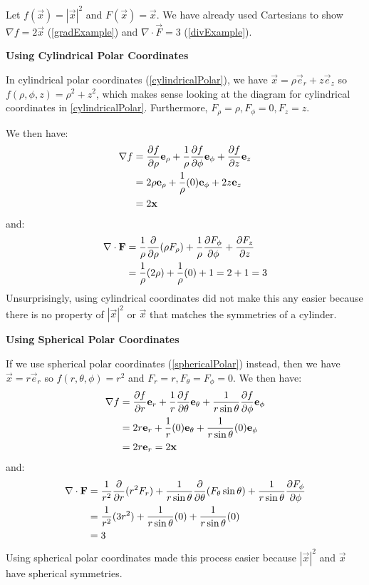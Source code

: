 \documentclass[../main.tex]{subfiles}
\begin{document}
\begin{example}
  Let $f(\vec{x}) = |\vec{x}|^2$ and $F(\vec{x}) = \vec{x}$.
  We have already used Cartesians to show $\nabla f = 2\vec{x}$ (\cref{gradExample}) and $\nabla \cdot \vec{F} = 3$ (\cref{divExample}).

  \textbf{Using Cylindrical Polar Coordinates}\par
  In cylindrical polar coordinates (\cref{cylindricalPolar}), we have $\vec{x} = \rho \vec{e}_r + z \vec{e}_z$ so $f(\rho, \phi, z) = \rho^2 + z^2$, which makes sense looking at the diagram for cylindrical coordinates in \cref{cylindricalPolar}.
  Furthermore, $F_\rho = \rho, F_\phi = 0, F_z = z$.

  We then have:
  \begin{align*}
    \nabla f &= \pderiv{f}{\rho} \vec{e}_\rho + \frac{1}{\rho}\pderiv{f}{\phi} \vec{e}_\phi + \pderiv{f}{z} \vec{e}_z \\
             &= 2\rho \vec{e}_\rho + \frac{1}{\rho}(0)\vec{e}_\phi  + 2z \vec{e}_z \\
             &= 2\vec{x}
  \end{align*}
  and:
  \begin{align*}
    \nabla \cdot \vec{F} &= \frac{1}{\rho} \pderiv{}{\rho}(\rho F_\rho) + \frac{1}{\rho} \pderiv{F_\phi}{\phi} + \pderiv{F_z}{z} \\
                         &= \frac{1}{\rho}(2\rho) + \frac{1}{\rho}(0) + 1 = 2 + 1 = 3
  \end{align*}
  Unsurprisingly, using cylindrical coordinates did not make this any easier because there is no property of $|\vec{x}|^2$ or $\vec{x}$ that matches the symmetries of a cylinder.

  \textbf{Using Spherical Polar Coordinates}\par
  If we use spherical polar coordinates (\cref{sphericalPolar}) instead, then we have $\vec{x} = r\vec{e}_r$ so $f(r, \theta, \phi) = r^2$ and $F_r = r, F_\theta = F_\phi = 0$. We then have:
  \begin{align*}
    \nabla f &= \pderiv{f}{r} \vec{e}_r + \frac{1}{r} \pderiv{f}{\theta} \vec{e}_\theta + \frac{1}{r \sin \theta} \pderiv{f}{\phi} \vec{e}_\phi \\
             &= 2r \vec{e}_r + \frac{1}{r} (0) \vec{e}_\theta + \frac{1}{r\sin \theta} (0) \vec{e}_\phi \\
             &= 2r\vec{e}_r = 2\vec{x}
  \end{align*}
  and:
  \begin{align*}
    \nabla \cdot \vec{F} &= \frac{1}{r^2} \pderiv{}{r}(r^2 F_r) + \frac{1}{r \sin \theta} \pderiv{}{\theta}(F_\theta \sin \theta) + \frac{1}{r \sin \theta} \pderiv{F_\phi}{\phi} \\
                         &= \frac{1}{r^2} (3r^2) + \frac{1}{r \sin \theta}(0) + \frac{1}{r \sin \theta}(0) \\
                         &= 3
  \end{align*}
  Using spherical polar coordinates made this process easier because $|\vec{x}|^2$ and $\vec{x}$ have spherical symmetries.
\end{example}
\end{document}
